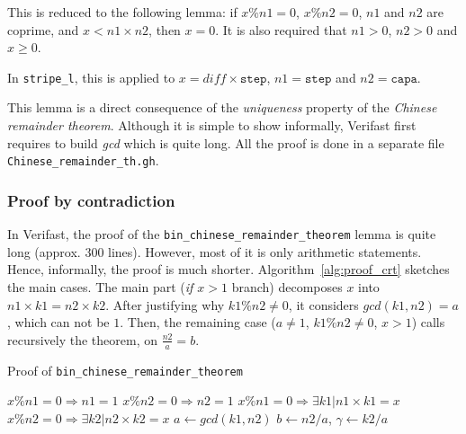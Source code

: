 \documentclass[oneside]{article}
\begin{document}
This is reduced to the following lemma: if $x\%n1 = 0$, $x\%n2 = 0$, $n1$ and $n2$ are coprime, and $x < n1 \times n2$, then $x = 0$. It is also required that $n1 > 0$, $n2 > 0$ and $x \geq 0$.

In \texttt{stripe\_l}, this is applied to $x = diff\times \mathtt{step}$, $n1 = \mathtt{step}$ and $n2 = \mathtt{capa}$.

This lemma is a direct consequence of the \emph{uniqueness} property of the \emph{Chinese remainder theorem}. Although it is simple to show informally, Verifast first requires to build \emph{gcd} which is quite long. All the proof is done in a separate file \texttt{Chinese\_remainder\_th.gh}. 

\subsubsection{Proof by contradiction}
In Verifast, the proof of the \texttt{bin\_chinese\_remainder\_theorem} lemma is quite long (approx. 300 lines). However, most of it is only arithmetic statements. Hence, informally, the proof is much shorter. Algorithm~\ref{alg:proof_crt} sketches the main cases. The main part (\emph{if $x > 1$} branch) decomposes $x$ into $n1\times k1 = n2\times k2$. After justifying why $k1\%n2 \neq 0$, it considers $gcd(k1, n2) = a$, which can not be $1$. Then, the remaining case ($a \neq 1$, $k1\%n2 \neq 0$, $x > 1$) calls recursively the theorem, on $\frac{n2}{a} = b$.
\begin{algorithm}
	\caption{Proof of \texttt{bin\_chinese\_remainder\_theorem}\label{alg:proof_crt}}
	{
		$x\%n1 = 0 \Rightarrow n1 = 1$\;
		$x\%n2 = 0 \Rightarrow n2 = 1$\;
		\;
		\;
		\Contradiction\;
	}
	{
		$x\%n1 = 0 \Rightarrow \exists k1 | n1\times k1 = x$ \;
		$x\%n2 = 0 \Rightarrow \exists k2 | n2\times k2 = x$ \;
		\;
		{
			$a \longleftarrow gcd(k1, n2)$\;
			$b \longleftarrow n2/a$, \;
			$\gamma \longleftarrow k2/a$\;
			\;
		}
	}
\end{algorithm}
\end{document}
